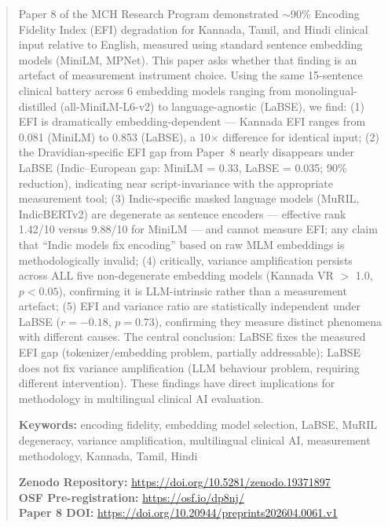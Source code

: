 \documentclass[11pt,a4paper]{article}
\begin{document}
\begin{abstract}
\noindent Paper 8 of the MCH Research Program demonstrated $\sim$90\% Encoding Fidelity
Index (EFI) degradation for Kannada, Tamil, and Hindi clinical input relative to English,
measured using standard sentence embedding models (MiniLM, MPNet). This paper asks whether
that finding is an artefact of measurement instrument choice. Using the same 15-sentence
clinical battery across 6 embedding models ranging from monolingual-distilled
(all-MiniLM-L6-v2) to language-agnostic (LaBSE), we find: (1) EFI is dramatically
embedding-dependent --- Kannada EFI ranges from 0.081 (MiniLM) to 0.853 (LaBSE), a
10$\times$ difference for identical input; (2) the Dravidian-specific EFI gap from Paper~8
nearly disappears under LaBSE (Indic--European gap: MiniLM = 0.33, LaBSE = 0.035; 90\%
reduction), indicating near script-invariance with the appropriate measurement tool; (3)
Indic-specific masked language models (MuRIL, IndicBERTv2) are degenerate as sentence
encoders --- effective rank 1.42/10 versus 9.88/10 for MiniLM --- and cannot measure EFI;
any claim that ``Indic models fix encoding'' based on raw MLM embeddings is methodologically
invalid; (4) critically, variance amplification persists across ALL five non-degenerate
embedding models (Kannada VR $>$ 1.0, $p < 0.05$), confirming it is LLM-intrinsic rather
than a measurement artefact; (5) EFI and variance ratio are statistically independent under
LaBSE ($r = -0.18$, $p = 0.73$), confirming they measure distinct phenomena with different
causes. The central conclusion: LaBSE fixes the measured EFI gap (tokenizer/embedding
problem, partially addressable); LaBSE does not fix variance amplification (LLM behaviour
problem, requiring different intervention). These findings have direct implications for
methodology in multilingual clinical AI evaluation.

\vspace{0.5em}
\noindent\textbf{Keywords:} encoding fidelity, embedding model selection, LaBSE, MuRIL
degeneracy, variance amplification, multilingual clinical AI, measurement methodology,
Kannada, Tamil, Hindi

\vspace{0.5em}
\noindent\textbf{Zenodo Repository:}
\url{https://doi.org/10.5281/zenodo.19371897}\\
\noindent\textbf{OSF Pre-registration:} \url{https://osf.io/dp8nj/}\\
\noindent\textbf{Paper 8 DOI:} \url{https://doi.org/10.20944/preprints202604.0061.v1}
\end{abstract}
\end{document}
